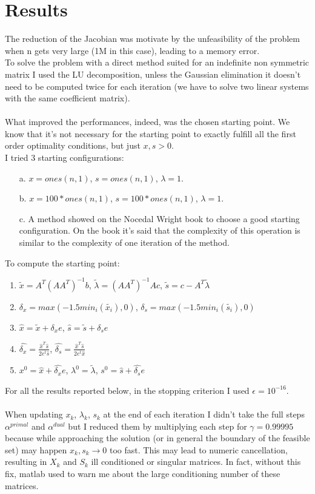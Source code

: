 \documentclass[]{article}
\begin{document}
\section{Results}
The reduction of the Jacobian was motivate by the unfeasibility of the problem when n gets very large (1M in this case), leading to a memory error.\\
To solve the problem with a direct method suited for an indefinite non symmetric matrix I used the LU decomposition, unless the Gaussian elimination it doesn't need to be computed twice for each iteration (we have to solve two linear systems with the same coefficient matrix).\\\\
What improved the performances, indeed, was the chosen starting point. We know that it's not necessary for the starting point to exactly fulfill all the first order optimality conditions, but just $x, s > 0$.\\
I tried 3 starting configurations:
\begin{enumerate}
	\item [a.]$x=ones(n,1)$, $s=ones(n,1)$, $\lambda = 1$.
	\item [b.]$x=100*ones(n,1)$, $s=100*ones(n,1)$,
	 $\lambda = 1$.
	 \item [c.] A method showed on the Nocedal Wright book to choose a good starting configuration. On the book it's said that the complexity of this operation is similar to the complexity of one iteration of the method.
\end{enumerate} 
To compute the starting point:
\begin{enumerate}
	\item $\tilde{x} = A^T(AA^T)^{-1}b$, $\tilde{\lambda} = (AA^T)^{-1}Ac$, $\tilde{s} = c-A^T\tilde{\lambda}$
	\item $\delta_x=max(-1.5min_i(\tilde{x_i}),0)$, $\delta_s=max(-1.5min_i(\tilde{s_i}),0)$
	\item $\hat{x} = \tilde{x} + \delta_xe$, $\hat{s} = \tilde{s} + \delta_se$
	\item $\hat{\delta_x}=\frac{\hat{x}^T\hat{s}}{2e^t\hat{s}}$, $\hat{\delta_s}=\frac{\hat{x}^T\hat{s}}{2e^t\hat{x}}$
	\item $x^0 = \hat{x} + \hat{\delta_x}e$, $\lambda^0=\tilde{\lambda}$, $s^0 = \hat{s} + \hat{\delta_s}e$
\end{enumerate}
For all the results reported below, in the stopping criterion I used $\epsilon=10^{-16}$.\\\\
When updating $x_k$, $\lambda_k$, $s_k$ at the end of each iteration I didn't take the full steps $\alpha^{primal}$ and $\alpha^{dual}$ but I reduced them by multiplying each step for $\gamma= 0.99995$ because while approaching the solution (or in general the boundary of the feasible set) may happen $x_k,s_k \to0$ too fast. This may lead to numeric cancellation, resulting in $X_k$ and $S_k$ ill conditioned or singular matrices. In fact, without this fix, matlab used to warn me about the large conditioning number of these matrices. 
\pagebreak
\end{document}
